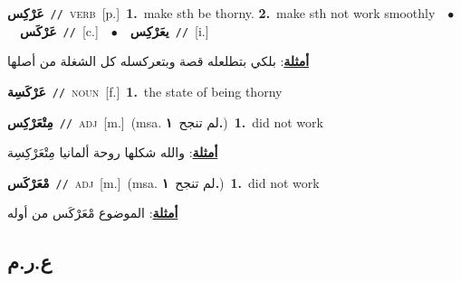 \documentclass[10pt,a4paper,twoside]{article} %
\begin{document}
\begin{multicols}{2}
{\setlength\topsep{0pt}\textbf{\foreignlanguage{arabic}{عَرْكِس}}\ {\color{gray}\texttt{//}\color{black}}\ \textsc{verb}\ [p.]\ \textbf{1.}~make sth be thorny.  \textbf{2.}~make sth not work smoothly\ \ $\bullet$\ \ \setlength\topsep{0pt}\textbf{\foreignlanguage{arabic}{عَرْكَس}}\ {\color{gray}\texttt{//}\color{black}}\ [c.]\ \ $\bullet$\ \ \setlength\topsep{0pt}\textbf{\foreignlanguage{arabic}{يعَرْكِس}}\ {\color{gray}\texttt{//}\color{black}}\ [i.]\  \begin{flushright}\color{gray}\foreignlanguage{arabic}{\textbf{\underline{\foreignlanguage{arabic}{أمثلة}}}: بلكي بتطلعله قصة وبتعركسله كل الشغلة من أصلها}\end{flushright}\color{black}} \vspace{2mm}

{\setlength\topsep{0pt}\textbf{\foreignlanguage{arabic}{عَرْكَسِة}}\ {\color{gray}\texttt{//}\color{black}}\ \textsc{noun}\ [f.]\ \textbf{1.}~the state of being thorny\ } \vspace{2mm}

{\setlength\topsep{0pt}\textbf{\foreignlanguage{arabic}{مِتْعَرْكِس}}\ {\color{gray}\texttt{//}\color{black}}\ \textsc{adj}\ [m.]\ \color{gray}(msa. \foreignlanguage{arabic}{لم تنجح}~\foreignlanguage{arabic}{\textbf{١.}})\color{black}\ \textbf{1.}~did not work\  \begin{flushright}\color{gray}\foreignlanguage{arabic}{\textbf{\underline{\foreignlanguage{arabic}{أمثلة}}}: والله شكلها روحة ألمانيا مِتْعَرْكِسِة}\end{flushright}\color{black}} \vspace{2mm}

{\setlength\topsep{0pt}\textbf{\foreignlanguage{arabic}{مْعَرْكَس}}\ {\color{gray}\texttt{//}\color{black}}\ \textsc{adj}\ [m.]\ \color{gray}(msa. \foreignlanguage{arabic}{لم تنجح}~\foreignlanguage{arabic}{\textbf{١.}})\color{black}\ \textbf{1.}~did not work\  \begin{flushright}\color{gray}\foreignlanguage{arabic}{\textbf{\underline{\foreignlanguage{arabic}{أمثلة}}}: الموضوع مْعَرْكَس من أوله}\end{flushright}\color{black}} \vspace{2mm}

\vspace{-3mm}
\subsection*{\color{blue}\foreignlanguage{arabic}{ع.ر.م}\color{blue}{}} 


\end{multicols}
\end{document}
